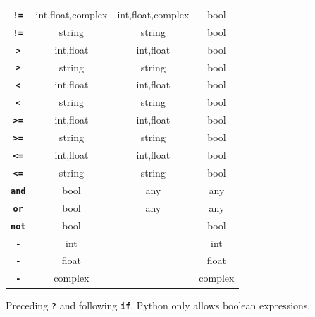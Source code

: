 \begin{center}
\begin{tabular}{c|c|c|c}
\texttt{\textbf{!=}} & int,float,complex   & int,float,complex     & bool\\
\texttt{\textbf{!=}} & string   & string     & bool\\
\texttt{\textbf{>}} & int,float   & int,float     & bool\\
\texttt{\textbf{>}} & string   & string     & bool\\
\texttt{\textbf{<}} & int,float   & int,float     & bool\\
\texttt{\textbf{<}} & string   & string     & bool\\
\texttt{\textbf{>=}} & int,float   & int,float     & bool\\
\texttt{\textbf{>=}} & string   & string     & bool\\
\texttt{\textbf{<=}}    & int,float   & int,float     & bool\\
\texttt{\textbf{<=}} & string   & string     & bool\\
\texttt{\textbf{and}} & bool & any & any\\
\texttt{\textbf{or}}  & bool & any & any\\
\texttt{\textbf{not}} & bool &     & bool\\
\texttt{\textbf{-}}    & int &    & int\\
\texttt{\textbf{-}}    & float &    & float\\
\texttt{\textbf{-}}    & complex &    & complex

\end{tabular}
\end{center}

Preceding \texttt{\textbf{?}} and following \texttt{\textbf{if}}, Python only allows boolean expressions.
